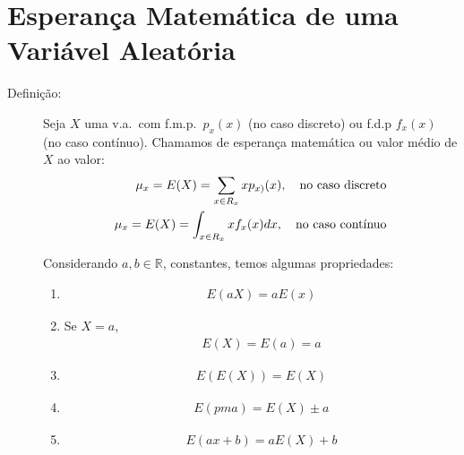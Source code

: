      \section{Esperança Matemática de uma Variável Aleatória}
     \begin{description}
       \item [Definição:] Seja $X$ uma v.a.\ com f.m.p.\ $p_{x}(x)$ (no caso discreto) ou f.d.p
         $f_{x}(x)$ (no caso contínuo). Chamamos de esperança matemática ou valor médio 
         de $X$ ao valor: 
         \begin{align}
           \mu_{x}= E(X)= \sum \limits_{x \in R_{x}} x p_{x)}(x) , 
           \text{\quad no caso discreto}\\
           \mu_{x}= E(X)= \int_{x \in R_{x}} x f_{x}(x)dx, \text{\quad no caso contínuo}
         \end{align}

         Considerando $a,b \in \mathbb{R}$, constantes, temos  algumas propriedades:

         \begin{enumerate}[label=(\alph*)]
           \item 
             \begin{align}
               E(aX)=aE(x)
             \end{align}
           \item Se $X=a$, 
             \begin{align}
               E(X)=E(a)=a
             \end{align}
           \item 
           \begin{align}    E(E(X))= E(X)\end{align}
           \item 
           \begin{align}  E(pm a)=E(X)\pm a\end{align}
\item 
\begin{align}  E(ax + b)=aE(X)+ b\end{align}


\end{enumerate}
\end{description}
